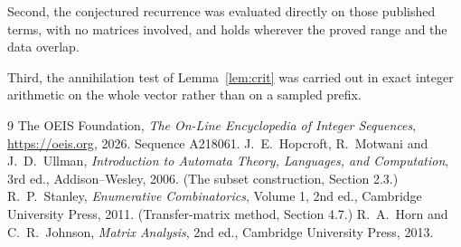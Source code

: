 \documentclass[11pt,a4paper]{article}
\theoremstyle{plain}
\theoremstyle{definition}
\begin{document}
Second, the conjectured recurrence was evaluated directly on those published terms, with no
matrices involved, and holds wherever the proved range and the data overlap.

Third, the annihilation test of Lemma~\ref{lem:crit} was carried out in exact integer
arithmetic on the whole vector rather than on a sampled prefix.

\begin{thebibliography}{9}
 The OEIS Foundation, \emph{The On-Line Encyclopedia of Integer
Sequences}, \url{https://oeis.org}, 2026. Sequence A218061.
 J.~E.~Hopcroft, R.~Motwani and J.~D.~Ullman, \emph{Introduction to Automata
Theory, Languages, and Computation}, 3rd ed., Addison--Wesley, 2006. (The subset
construction, Section 2.3.)
 R.~P.~Stanley, \emph{Enumerative Combinatorics}, Volume 1, 2nd ed.,
Cambridge University Press, 2011. (Transfer-matrix method, Section 4.7.)
 R.~A.~Horn and C.~R.~Johnson, \emph{Matrix Analysis}, 2nd ed., Cambridge
University Press, 2013.
\end{thebibliography}
\end{document}
